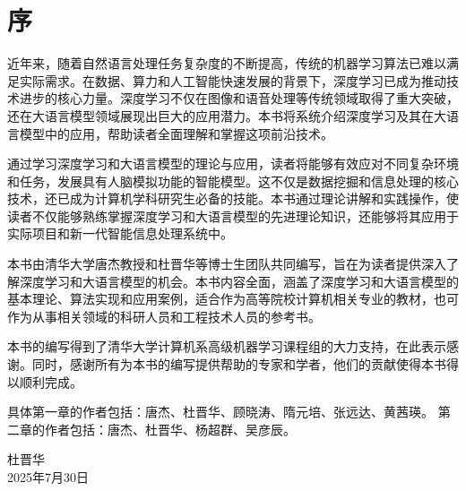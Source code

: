 \chapter*{序}

近年来，随着自然语言处理任务复杂度的不断提高，传统的机器学习算法已难以满足实际需求。在数据、算力和人工智能快速发展的背景下，深度学习已成为推动技术进步的核心力量。深度学习不仅在图像和语音处理等传统领域取得了重大突破，还在大语言模型领域展现出巨大的应用潜力。本书将系统介绍深度学习及其在大语言模型中的应用，帮助读者全面理解和掌握这项前沿技术。

通过学习深度学习和大语言模型的理论与应用，读者将能够有效应对不同复杂环境和任务，发展具有人脑模拟功能的智能模型。这不仅是数据挖掘和信息处理的核心技术，还已成为计算机学科研究生必备的技能。本书通过理论讲解和实践操作，使读者不仅能够熟练掌握深度学习和大语言模型的先进理论知识，还能够将其应用于实际项目和新一代智能信息处理系统中。

本书由清华大学唐杰教授和杜晋华等博士生团队共同编写，旨在为读者提供深入了解深度学习和大语言模型的机会。本书内容全面，涵盖了深度学习和大语言模型的基本理论、算法实现和应用案例，适合作为高等院校计算机相关专业的教材，也可作为从事相关领域的科研人员和工程技术人员的参考书。

本书的编写得到了清华大学计算机系高级机器学习课程组的大力支持，在此表示感谢。同时，感谢所有为本书的编写提供帮助的专家和学者，他们的贡献使得本书得以顺利完成。

具体第一章的作者包括：唐杰、杜晋华、顾晓涛、隋元培、张远达、黄茜瑛。
第二章的作者包括：唐杰、杜晋华、杨超群、吴彦辰。



\begin{flushright}
    杜晋华\\
    2025年7月30日
\end{flushright}